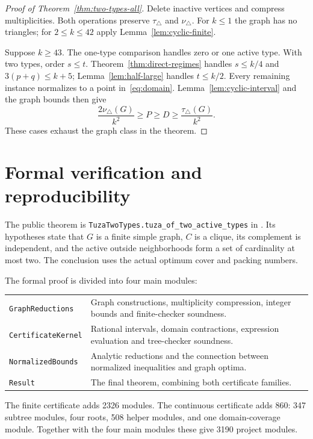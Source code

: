 \documentclass[11pt]{article}
\newcommand{\tp}{\nu_{\triangle}}
\newcommand{\tc}{\tau_{\triangle}}
\begin{document}
\begin{proof}[Proof of Theorem~\ref{thm:two-types-all}]
Delete inactive vertices and compress multiplicities. Both operations
preserve $\tc$ and $\tp$. For $k\leq1$ the graph has no triangles;
for $2\leq k\leq42$ apply Lemma~\ref{lem:cyclic-finite}.

Suppose $k\geq43$. The one-type comparison handles zero or one active
type. With two types, order $s\leq t$. Theorem~\ref{thm:direct-regimes}
handles $s\leq k/4$ and $3(p+q)\leq k+5$;
Lemma~\ref{lem:half-large} handles $t\leq k/2$.
Every remaining instance normalizes to a point
in~\eqref{eq:domain}. Lemma~\ref{lem:cyclic-interval} and the graph
bounds then give
\[
 \frac{2\tp(G)}{k^2}\geq P\geq D\geq\frac{\tc(G)}{k^2}.
\]
These cases exhaust the graph class in the theorem.
\end{proof}

\section{Formal verification and reproducibility}\label{sec:formal}
The public theorem is
\texttt{TuzaTwoTypes.tuza\_of\_two\_active\_types} in
. Its hypotheses state that $G$ is a finite
simple graph, $C$ is a clique, its complement is independent, and the
active outside neighborhoods form a set of cardinality at most two.
The conclusion uses the actual optimum cover and packing numbers.

The formal proof is divided into four main modules:
\begin{center}
\begin{tabular}{lp{83mm}}
\toprule
\texttt{GraphReductions}&Graph constructions, multiplicity compression,
integer bounds and finite-checker soundness.\\
\texttt{CertificateKernel}&Rational intervals, domain contractions,
expression evaluation and tree-checker soundness.\\
\texttt{NormalizedBounds}&Analytic reductions and the connection between
normalized inequalities and graph optima.\\
\texttt{Result}&The final theorem, combining both certificate families.\\
\bottomrule
\end{tabular}
\end{center}
The finite certificate adds 2326 modules. The continuous certificate
adds 860: 347 subtree modules, four roots, 508 helper modules, and one
domain-coverage module. Together with the four main modules these give
3190 project modules.
\end{document}
